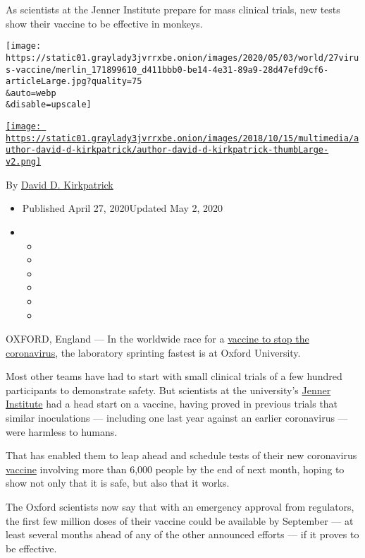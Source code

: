 As scientists at the Jenner Institute prepare for mass clinical trials,
new tests show their vaccine to be effective in monkeys.

\texttt{[image: https://static01.graylady3jvrrxbe.onion/images/2020/05/03/world/27virus-vaccine/merlin\_171899610\_d411bbb0-be14-4e31-89a9-28d47efd9cf6-articleLarge.jpg?quality=75\\\&auto=webp\\\&disable=upscale]}

\href{https://www.nytimes3xbfgragh.onion/by/david-d-kirkpatrick}{\texttt{[image: https://static01.graylady3jvrrxbe.onion/images/2018/10/15/multimedia/author-david-d-kirkpatrick/author-david-d-kirkpatrick-thumbLarge-v2.png]}}

By
\href{https://www.nytimes3xbfgragh.onion/by/david-d-kirkpatrick}{David
D. Kirkpatrick}

\begin{itemize}
\item
  Published April 27, 2020Updated May 2, 2020
\item
  \begin{itemize}
  \item
  \item
  \item
  \item
  \item
  \item
  \end{itemize}
\end{itemize}

OXFORD, England --- In the worldwide race for a
\href{https://www.nytimes3xbfgragh.onion/2020/04/08/health/coronavirus-vaccines.html}{vaccine
to stop the coronavirus}, the laboratory sprinting fastest is at Oxford
University.

Most other teams have had to start with small clinical trials of a few
hundred participants to demonstrate safety. But scientists at the
university's \href{https://www.jenner.ac.uk/}{Jenner Institute} had a
head start on a vaccine, having proved in previous trials that similar
inoculations --- including one last year against an earlier coronavirus
--- were harmless to humans.

That has enabled them to leap ahead and schedule tests of their new
coronavirus
\href{https://www.nytimes3xbfgragh.onion/2020/05/15/us/politics/coronavirus-vaccine-timeline.html}{vaccine}
involving more than 6,000 people by the end of next month, hoping to
show not only that it is safe, but also that it works.

The Oxford scientists now say that with an emergency approval from
regulators, the first few million doses of their vaccine could be
available by September --- at least several months ahead of any of the
other announced efforts --- if it proves to be effective.


